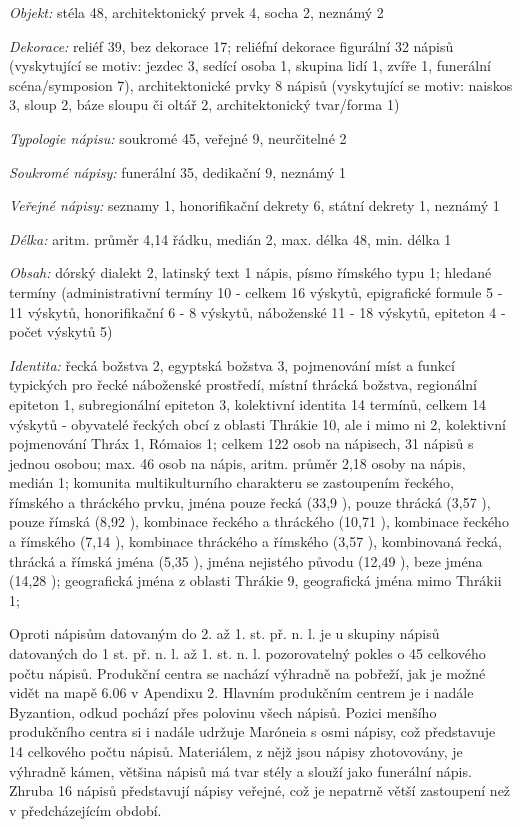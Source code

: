 {\em Objekt:} stéla 48, architektonický prvek 4, socha 2, neznámý 2

{\em Dekorace:} reliéf 39, bez dekorace 17; reliéfní dekorace figurální 32 nápisů (vyskytující se motiv: jezdec 3, sedící osoba 1, skupina lidí 1, zvíře 1, funerální scéna/symposion 7), architektonické prvky 8 nápisů (vyskytující se motiv: naiskos 3, sloup 2, báze sloupu či oltář 2, architektonický tvar/forma 1)

{\em Typologie nápisu:} soukromé 45, veřejné 9, neurčitelné 2

{\em Soukromé nápisy:} funerální 35, dedikační 9, neznámý 1

{\em Veřejné nápisy:} seznamy 1, honorifikační dekrety 6, státní dekrety 1, neznámý 1

{\em Délka:} aritm. průměr 4,14 řádku, medián 2, max. délka 48, min. délka 1

{\em Obsah:} dórský dialekt 2, latinský text 1 nápis, písmo římského typu 1; hledané termíny (administrativní termíny 10 - celkem 16 výskytů, epigrafické formule 5 - 11 výskytů, honorifikační 6 - 8 výskytů, náboženské 11 - 18 výskytů, epiteton 4 - počet výskytů 5)

{\em Identita:} řecká božstva 2, egyptská božstva 3, pojmenování míst a funkcí typických pro řecké náboženské prostředí, místní thrácká božstva, regionální epiteton 1, subregionální epiteton 3, kolektivní identita 14 termínů, celkem 14 výskytů - obyvatelé řeckých obcí z oblasti Thrákie 10, ale i mimo ni 2, kolektivní pojmenování Thráx 1, Rómaios 1; celkem 122 osob na nápisech, 31 nápisů s jednou osobou; max. 46 osob na nápis, aritm. průměr 2,18 osoby na nápis, medián 1; komunita multikulturního charakteru se zastoupením řeckého, římského a thráckého prvku, jména pouze řecká (33,9 ), pouze thrácká (3,57 ), pouze římská (8,92 ), kombinace řeckého a thráckého (10,71 ), kombinace řeckého a římského (7,14 ), kombinace thráckého a římského (3,57 ), kombinovaná řecká, thrácká a římská jména (5,35 ), jména nejistého původu (12,49 ), beze jména (14,28 ); geografická jména z oblasti Thrákie 9, geografická jména mimo Thrákii 1;

\NC\AR
\HL
\HL
\stoptable

Oproti nápisům datovaným do 2. až 1. st. př. n. l. je u skupiny nápisů datovaných do 1 st. př. n. l. až 1. st. n. l. pozorovatelný pokles o 45  celkového počtu nápisů. Produkční centra se nachází výhradně na pobřeží, jak je možné vidět na mapě 6.06 v Apendixu 2. Hlavním produkčním centrem je i nadále Byzantion, odkud pochází přes polovinu všech nápisů. Pozici menšího produkčního centra si i nadále udržuje Maróneia s osmi nápisy, což představuje 14  celkového počtu nápisů. Materiálem, z nějž jsou nápisy zhotovovány, je výhradně kámen, většina nápisů má tvar stély a slouží jako funerální nápis. Zhruba 16  nápisů představují nápisy veřejné, což je nepatrně větší zastoupení než v předcházejícím období.

